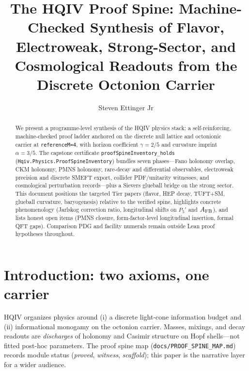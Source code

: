 \documentclass[11pt]{amsart}
\title{The HQIV Proof Spine: Machine-Checked Synthesis of Flavor, Electroweak, Strong-Sector, and Cosmological Readouts from the Discrete Octonion Carrier}
\author{Steven Ettinger Jr}
\begin{document}
\maketitle

\begin{abstract}
We present a programme-level synthesis of the HQIV physics stack: a self-reinforcing,
machine-checked proof ladder anchored on the discrete null lattice and octonionic carrier
at \texttt{referenceM=4}, with horizon coefficient $\gamma=2/5$ and curvature imprint
$\alpha=3/5$.
The capstone certificate \texttt{proofSpineInventory\_holds}
(\texttt{Hqiv.Physics.ProofSpineInventory}) bundles seven phases---Fano holonomy overlap,
CKM holonomy, PMNS holonomy, rare-decay and differential observables, electroweak precision
and discrete SMEFT export, collider PDF/unitarity witnesses, and cosmological perturbation
records---plus a Sievers glueball bridge on the strong sector.
This document positions the targeted Tier papers (flavor, HEP decay, TUFT+SM, glueball
curvature, baryogenesis) relative to the verified spine, highlights concrete phenomenology
(Jarlskog correction ratio, longitudinal shifts on $P_5'$ and $A_{\rm FB}$), and lists
honest open items (PMNS closure, form-factor-level longitudinal insertion, formal QFT gaps).
Comparison PDG and facility numerals remain outside Lean proof hypotheses throughout.
\end{abstract}

\section{Introduction: two axioms, one carrier}
HQIV organizes physics around (i) a discrete light-cone information budget and
(ii) informational monogamy on the octonion carrier.
Masses, mixings, and decay readouts are \emph{discharges} of holonomy and Casimir structure
on Hopf shells---not fitted post-hoc parameters.
The proof spine map (\texttt{docs/PROOF\_SPINE\_MAP.md}) records module status
(\emph{proved}, \emph{witness}, \emph{scaffold}); this paper is the narrative layer for
a wider audience.
\end{document}

